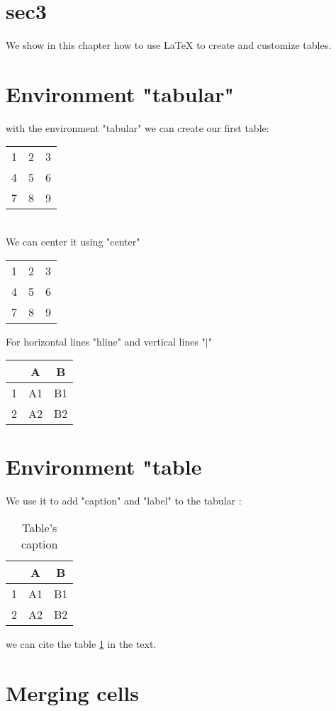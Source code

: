 \section{sec3}
We show in this chapter how to use LaTeX to create and customize tables.
\section{Environment "tabular"}
with the environment "tabular" we can create our first table:
\begin{tabular}{ c c c }
	1 & 2 & 3 \\ 
	4 & 5 & 6 \\  
	7 & 8 & 9    
\end{tabular}
\\We can center it using "center"
\begin{center}
	\begin{tabular}{ c c c }
		1 & 2 & 3 \\ 
		4 & 5 & 6 \\  
		7 & 8 & 9    
	\end{tabular}
\end{center}
For horizontal lines "hline" and vertical lines "|"
\begin{center}
	\begin{tabular}{ |c|c|c| } 
		\hline
		& A & B \\
		\hline \hline
		1 & A1 & B1 \\ 
		\hline
		2 & A2 & B2 \\ 
		\hline
	\end{tabular}
\end{center}
\section{Environment "table}
We use it to add "caption" and "label" to the tabular :
\begin{table}[]
	\centering
	\begin{tabular}{ |c|c|c| } 
		\hline
		& A & B \\
		\hline \hline
		1 & A1 & B1 \\ 
		\hline
		2 & A2 & B2 \\ 
		\hline
	\end{tabular}
	\caption{Table's caption}
	\label{tab:table0}
\end{table}
we can cite the table \ref{tab:table0} in the text.
\section{Merging cells}
